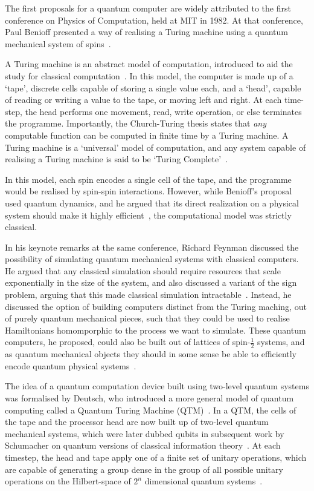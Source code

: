 The first proposals for a quantum computer are widely attributed to the first conference on Physics of Computation, held at MIT in 1982. At that conference, Paul Benioff presented a way of realising a Turing machine using a quantum mechanical system of spins~\cite{Benioff1980}.\par
A Turing machine is an abstract model of computation, introduced to aid the study for classical computation~\cite{Nielsen2000}. In this model, the computer is made up of a `tape', discrete cells capable of storing a single value each, and a `head', capable of reading or writing a value to the tape, or moving left and right. At each time-step, the head performs one movement, read, write operation, or else terminates the programme. Importantly, the Church-Turing thesis states that \emph{any} computable function can be computed in finite time by a Turing machine. A Turing machine is a `universal' model of computation, and any system capable of realising a Turing machine is said to be `Turing Complete'~\cite{Nielsen2000}.\par
In this model, each spin encodes a single cell of the tape, and the programme would be realised by spin-spin interactions. However, while Benioff's proposal used quantum dynamics, and he argued that its direct realization on a physical system should make it highly efficient~\cite{Benioff1980}, the computational model was strictly classical.\par
In his keynote remarks at the same conference, Richard Feynman discussed the possibility of simulating quantum mechanical systems with classical computers. He argued that any classical simulation should require resources that scale exponentially in the size of the system, and also discussed a variant of the sign problem, arguing that this made classical simulation intractable~\cite{Feynman1982}. Instead, he discussed the option of building computers distinct from the Turing maching, out of purely quantum mechanical pieces, such that they could be used to realise Hamiltonians homomporphic to the process we want to simulate. These quantum computers, he proposed, could also be built out of lattices of spin-$\frac{1}{2}$ systems, and as quantum mechanical objects they should in some sense be able to efficiently encode quantum physical systems~\cite{Feynman1982}.\par
The idea of a quantum computation device built using two-level quantum systems was formalised by Deutsch, who introduced a more general model of quantum computing called a Quantum Turing Machine (QTM)~\cite{Deutsch1985}. In a QTM, the cells of the tape and the processor head are now built up of two-level quantum mechanical systems, which were later dubbed qubits in subsequent work by Schumacher on quantum versions of classical information theory~\cite{Schumacher1995}. At each timestep, the head and tape apply one of a finite set of unitary operations, which are capable of generating a group dense in the group of all possible unitary operations on the Hilbert-space of $2^{n}$ dimensional quantum systems~\cite{Deutsch1985}.\par
